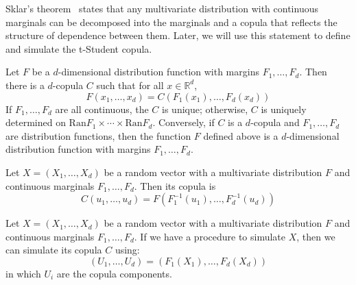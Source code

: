 \documentclass[11pt,fleqn]{book} %
\begin{document}
Sklar's theorem~\cite{sklar:1959} states that any multivariate 
distribution with continuous marginals can be decomposed into the marginals and 
a copula that reflects the structure of dependence between them. Later, we will 
use this statement to define and simulate the t-Student copula.

\begin{theorem}
	\label{thm:sklar}
	Let $F$ be a $d$-dimensional distribution function with margins 
	$F_1,\dots,F_d$. Then there is a $d$-copula $C$ such that for all 
	$x \in \mathbb{R}^d$,
	\begin{displaymath}
		F(x_1,\dots,x_d) = C(F_1(x_1),\dots,F_d(x_d))
	\end{displaymath}
	If $F_1,\dots,F_d$ are all continuous, the $C$ is unique; otherwise, $C$ is 
	uniquely determined on $\text{Ran}F_1 \times \cdots \times \text{Ran}F_d$.
	Conversely, if $C$ is a $d$-copula and $F_1,\dots,F_d$ are distribution 
	functions, then the function $F$ defined above is a $d$-dimensional 
	distribution function with margins $F_1,\dots,F_d$.
\end{theorem}

\begin{corollary}
	\label{cor:cop1}
	Let $X=(X_1, \dots, X_d)$ be a random vector with a multivariate 
	distribution $F$ and continuous marginals $F_1, \dots, F_d$. 
	Then its copula is
	\begin{displaymath}
		C(u_1,\dots,u_d) = F(F_1^{-1}(u_1), \dots, F_d^{-1}(u_d))
	\end{displaymath}
\end{corollary}

\begin{corollary}
	\label{cor:cop2}
	Let $X=(X_1, \dots, X_d)$ be a random vector with a multivariate 
	distribution $F$ and continuous marginals $F_1, \dots, F_d$.
	If we have a procedure to simulate $X$, then we can simulate 
	its copula $C$ using:
	\begin{displaymath}
		(U_1, \dots, U_d) = (F_1(X_1), \dots, F_d(X_d))
	\end{displaymath}
	in which $U_i$ are the copula components.
\end{corollary}
\end{document}
